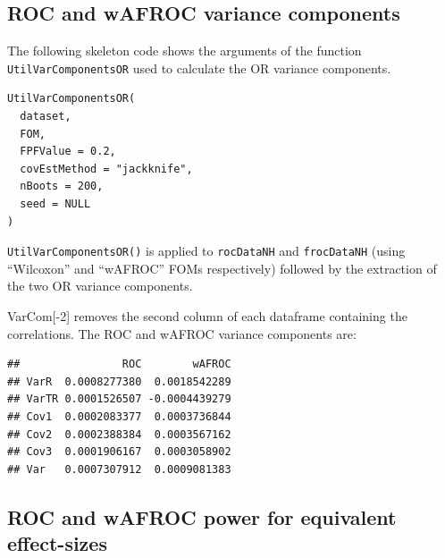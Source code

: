 \documentclass[
]{book}
\newenvironment{Shaded}{\begin{snugshade}}{\end{snugshade}}
\newcommand{\AttributeTok}[1]{\textcolor[rgb]{0.77,0.63,0.00}{#1}}
\newcommand{\DecValTok}[1]{\textcolor[rgb]{0.00,0.00,0.81}{#1}}
\newcommand{\FunctionTok}[1]{\textcolor[rgb]{0.00,0.00,0.00}{#1}}
\newcommand{\NormalTok}[1]{#1}
\newcommand{\OtherTok}[1]{\textcolor[rgb]{0.56,0.35,0.01}{#1}}
\newcommand{\SpecialCharTok}[1]{\textcolor[rgb]{0.00,0.00,0.00}{#1}}
\newcommand{\StringTok}[1]{\textcolor[rgb]{0.31,0.60,0.02}{#1}}
\begin{document}
\hypertarget{roc-and-wafroc-variance-components}{%
\subsection{ROC and wAFROC variance components}\label{roc-and-wafroc-variance-components}}

The following skeleton code shows the arguments of the function \texttt{UtilVarComponentsOR} used to calculate the OR variance components.

\begin{verbatim}
UtilVarComponentsOR(
  dataset,
  FOM,
  FPFValue = 0.2,
  covEstMethod = "jackknife",
  nBoots = 200,
  seed = NULL
)
\end{verbatim}

\texttt{UtilVarComponentsOR()} is applied to \texttt{rocDataNH} and \texttt{frocDataNH} (using ``Wilcoxon'' and ``wAFROC'' FOMs respectively) followed by the extraction of the two OR variance components.

\begin{Shaded}
\end{Shaded}

VarCom{[}-2{]} removes the second column of each dataframe containing the correlations. The ROC and wAFROC variance components are:

\begin{verbatim}
##                ROC        wAFROC
## VarR  0.0008277380  0.0018542289
## VarTR 0.0001526507 -0.0004439279
## Cov1  0.0002083377  0.0003736844
## Cov2  0.0002388384  0.0003567162
## Cov3  0.0001906167  0.0003058902
## Var   0.0007307912  0.0009081383
\end{verbatim}

\hypertarget{roc-and-wafroc-power-for-equivalent-effect-sizes}{%
\subsection{ROC and wAFROC power for equivalent effect-sizes}\label{roc-and-wafroc-power-for-equivalent-effect-sizes}}
\end{document}
